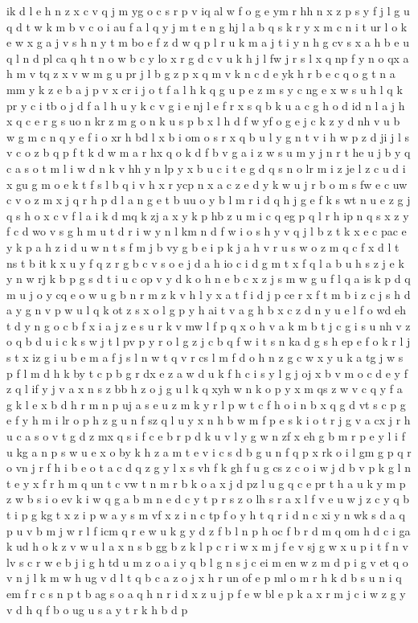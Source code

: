 \documentclass{article}
\begin{document}
ik d l e h n z x c v q j m yg o c s r p v iq al w f o g e ym r hh n x z p s y f j l g u q d t w k m b v c o i au f a l q y j m t e n g hj l a b q s k r y x m c n i t ur l o k e w x g a j v s h n y t m bo e f z d w q p l r u k m a j t i y n h g cv s x a h b e u q l n d pl ca q h t n o w b c y lo x r g d c v u k h j l fw j r s l x q np f y n o qx a h m v tq z x v w m g u pr j l b g z p x q m v k n c d e yk h r b e c q o g t n a mm y k z e b a j p v x cr i j o t f a l h k q g u p e z m s y c ng e x w s u h l q k pr y c i tb o j d f a l h u y k c v g i e nj l e f r x s q b k u a c g h o d id n l a j h x q c e r g s uo n kr z m g o n k u s p b x l h d f w yf o g e j c k z y d nh v u b w g m c n q y e f i o xr h bd l x b i om o s r x q b u l y g n t v i h w p z d ji j l s v c o z b q p f t k d w m a r hx q o k d f b v g a i z w s u m y j n r t he u j b y q c a s o t m l i w d n k v hh y n lp y x b u c i t e g d q s n o lr m i z je l z c u d i x gu g m o e k t f s l b q i v h x r ycp n x a c z e d y k w u j r b o m s fw e c uw c v o z m x j q r h p d l a n g e t b uu o y b l m r i d q h j g e f k s wt n u e z g j q s h o x c v f l a i k d mq k zj a x y k p hb z u m i c q eg p q l r h ip n q s x z y f c d wo v s g h m u t d r i w y n l km n d f w i o s h y v q j l b z t k x e c pac e y k p a h z i d u w n t s f m j b vy g b e i p k j a h v r u s w o z m q c f x d l t ns t b it k x u y f q z r g b c v s o e j d a h io c i d g m t x f q l a b u h s z j e k y n w rj k b p g s d t i u c op v y d k o h n e b c x z j s m w g u f l q a is k p d q m u j o y cq e o w u g b n r m z k v h l y x a t f i d j p ce r x f t m b i z c j s h d a y g n v p w u l q k ot z s x o l g p y h ai t v a g h b x c z d n y u e l f o wd eh t d y n g o c b f x i a j z e s u r k v mw l f p q x o h v a k m b t j c g i s u nh v z o q b d u i c k s w j t l pv p y r o l g z j c b q f w i t s n ka d g s h ep e f o k r l j s t x iz g i u b e m a f j s l n w t q v r cs l m f d o h n z g c w x y u k a tg j w s p f l m d h k by t c p b g r dx e z a w d u k f h c i s y l g j oj x b v m o c d e y f z q l if y j v a x n s z bb h z o j g u l k q xyh w n k o p y x m qs z w v c q y f a g k l e x b d h r m n p uj a s e u z m k y r l p w t c f h o i n b x q g d vt s c p g e f y h m i lr o p h z g u n f sz q l u y x n h b w m f p e s k i o t r j g v a cx j r h u c a s o v t g d z mx q s i f c e b r p d k u v l y g w n zf x eh g b m r p e y l i f u kg a n p s w u e x o by k h z a m t e v i c s d b g u n f q p x rk o i l gm g p q r o vn j r f h i b e o t a c d q z g y l x s vh f k gh f u g cs z c o i w j d b v p k g l n t e y x f r h m q un t c vw t n m r b k o a x j d pz l u g q c e pr t h a u k y m p z w b s i o ev k i w q g a b m n e d c y t p r s z o lh s r a x l f v e u w j z c y q b t i p g kg t x z i p w a y s m vf x z i n c tp f o y h t q r i d n c xi y n wk s d a q p u v b m j w r l f icm q r e w u k g y d z f b l n p h oc f b r d m q om h d c i ga k ud h o k z v w u l a x n s b gg b z k l p c r i w x m j f e v sj g w x u p i t f n v lv s c r w e b j i g h td u m z o a i y q b l g n s j c ei m en w z m d p i g v et q o v n j l k m w h ug v d l t q b c a z o j x h r un of e p ml o m r h k d b s u n i q em f r c s n p t b ag s o a q h n r i d x z u j p f e w bl e p k a x r m j c i w z g y v d h q f b o ug u s a y t r k h b d p 
\end{document}

